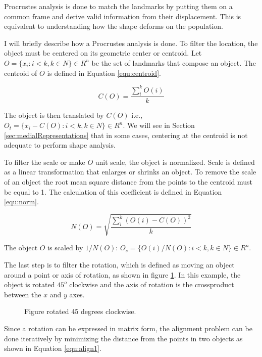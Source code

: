 Procrustes analysis is done to match the landmarks 
by putting them on a common frame and derive valid information 
from their displacement. 
This is equivalent to understanding how the shape deforms
on the population. 

I will briefly describe how a Procrustes analysis is done.
To filter the location, the object must be centered on its geometric center or centroid.
Let $O = \{x_i: i < k, k \in N\} \in R^n$ be the set of landmarks that compose an object.
The centroid of $O$ is defined in Equation \ref{equ:centroid}. 

\begin{equation}
  C(O) = \frac{\sum_i^k O(i)}{k}
  \label{equ:centroid}
\end{equation}

The object is then translated by $C(O)$ i.e., $O_t = \{x_i - C(O): i < k, k \in N\} \in R^n$.
We will see in Section \ref{sec:medialRepresentations} that in some cases, centering at the centroid 
is not adequate to perform shape analysis.

To filter the scale or make $O$ unit scale, the object is normalized.
Scale is defined as a linear transformation that enlarges or shrinks an object.
To remove the scale of an object the root mean square distance from the points to the centroid must be equal to 1.
The calculation of this coefficient is defined in Equation \ref{equ:norm}.

\begin{equation}
 N(O) = \sqrt{\frac{\sum_i^k (O(i) - C(O))^2}{k}}  
 \label{equ:norm}
\end{equation}

The object $O$ is scaled by $1/N(O)$: $O_s = \{O(i)/N(O): i < k, k \in N\} \in R^n$.

The last step is to filter the rotation, 
which is defined as moving an object around a point or axis of rotation, as shown in figure \ref{fig:Rotation}.
In this example, the object is rotated $45^o$ clockwise and the axis of rotation
is the crossproduct between the $x$ and $y$ axes.

\begin{figure} 
 \centering 
 \caption[Rotated figure.]{Figure rotated 45 degrees clockwise.}
 \label{fig:Rotation}  
\end{figure}

Since a rotation can be expressed in matrix form,
the alignment problem can be done 
iteratively by minimizing the distance from the points 
in two objects as shown in Equation \ref{equ:align1}.

